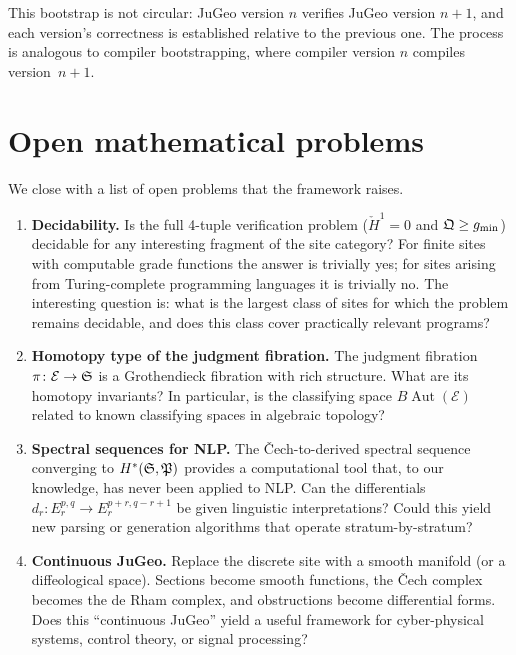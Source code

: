 This bootstrap is not circular: JuGeo version $n$ verifies JuGeo
version $n+1$, and each version's correctness is established
relative to the previous one.  The process is analogous to
compiler bootstrapping, where compiler version $n$ compiles
version~$n+1$.

\section{Open mathematical problems}
\label{sec:open-problems}

We close with a list of open problems that the framework raises.

\begin{enumerate}
  \item \textbf{Decidability.}\;
        Is the full 4-tuple verification problem ($\check{H}^1 = 0$
        and $\mathfrak{Q} \geq g_{\min}$) decidable for any interesting
        fragment of the site category?  For finite sites with
        computable grade functions the answer is trivially yes; for
        sites arising from Turing-complete programming languages
        it is trivially no.  The interesting question is: what is
        the largest class of sites for which the problem remains
        decidable, and does this class cover practically relevant
        programs?

  \item \textbf{Homotopy type of the judgment fibration.}\;
        The judgment fibration $\pi\colon \mathcal{E} \to \mathfrak{S}$
        is a Grothendieck fibration with rich structure.  What are
        its homotopy invariants?  In particular, is the classifying
        space $B\!\operatorname{Aut}(\mathcal{E})$ related to known
        classifying spaces in algebraic topology?

  \item \textbf{Spectral sequences for NLP.}\;
        The \v{C}ech-to-derived spectral sequence converging to
        $H^*(\mathfrak{S}, \mathfrak{P})$ provides a computational tool that, to
        our knowledge, has never been applied to NLP\@.  Can the
        differentials $d_r\colon E_r^{p,q} \to E_r^{p+r,q-r+1}$
        be given linguistic interpretations?  Could this yield new
        parsing or generation algorithms that operate stratum-by-stratum?

  \item \textbf{Continuous JuGeo.}\;
        Replace the discrete site with a smooth manifold (or a
        diffeological space).  Sections become smooth functions,
        the \v{C}ech complex becomes the de Rham complex, and
        obstructions become differential forms.  Does this
        ``continuous JuGeo'' yield a useful framework for
        cyber-physical systems, control theory, or signal processing?


\end{enumerate}
